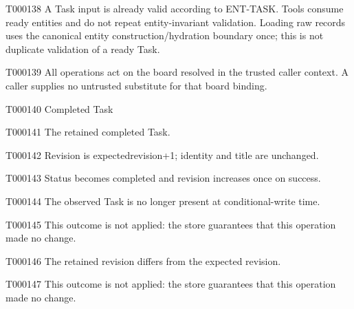 \documentclass[11pt,a4paper]{article}
\begin{document}
\begin{atlasparagraph}{T000138}
A Task input is already valid according to ENT-TASK. Tools consume ready entities and do not repeat entity-invariant validation. Loading raw records uses the canonical entity construction/hydration boundary once; this is not duplicate validation of a ready Task.
\end{atlasparagraph}
\begin{atlasparagraph}{T000139}
All operations act on the board resolved in the trusted caller context. A caller supplies no untrusted substitute for that board binding.
\end{atlasparagraph}
\begin{atlastext}{T000140}
Completed Task
\end{atlastext}
\begin{atlasparagraph}{T000141}
The retained completed Task.
\end{atlasparagraph}
\begin{atlasparagraph}{T000142}
Revision is expected\AtlasCharUnderscore{}revision+1; identity and title are unchanged.
\end{atlasparagraph}
\begin{atlasparagraph}{T000143}
Status becomes completed and revision increases once on success.
\end{atlasparagraph}
\begin{atlasparagraph}{T000144}
The observed Task is no longer present at conditional-write time.
\end{atlasparagraph}
\begin{atlasparagraph}{T000145}
This outcome is not applied: the store guarantees that this operation made no change.
\end{atlasparagraph}
\begin{atlasparagraph}{T000146}
The retained revision differs from the expected revision.
\end{atlasparagraph}
\begin{atlasparagraph}{T000147}
This outcome is not applied: the store guarantees that this operation made no change.
\end{atlasparagraph}
\end{document}
